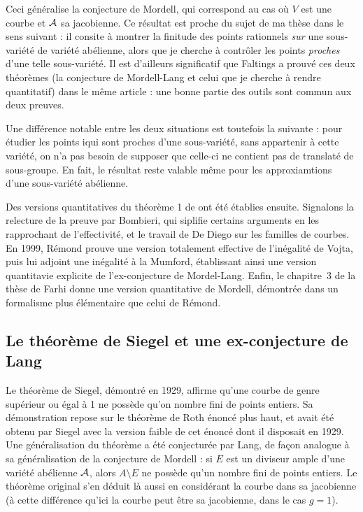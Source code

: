 \documentclass[a4paper, 11pt]{article}
\renewcommand*\bsc{}
\begin{document}
Ceci généralise la conjecture de \bsc{Mordell}, qui correspond au cas où $V$
est une courbe et $\mathcal A$ sa jacobienne. Ce résultat est proche du sujet de ma
thèse dans le sens suivant : il consite à montrer la finitude des points
rationnels \emph{sur} une sous-variété de variété abélienne, alors que je
cherche à contrôler les points \emph{proches} d'une telle sous-variété. Il est
d'ailleurs significatif que \bsc{Faltings} a prouvé ces deux théorèmes (la
conjecture de \bsc{Mordell-Lang} et celui que je cherche à rendre quantitatif)
dans le même article : une bonne partie des outils sont commun aux deux
preuves.

Une différence notable entre les deux situations est toutefois la suivante :
pour étudier les points iqui sont proches d'une sous-variété, sans appartenir
à cette variété, on n'a pas besoin de supposer que celle-ci ne contient pas de
translaté de sous-groupe. En fait, le résultat reste valable même pour les
approxiamtions d'une sous-variété abélienne.

Des versions quantitatives du théorème 1 de \cite{falda} ont été établies
ensuite. Signalons la relecture de la preuve par \bsc{Bombieri}, qui siplifie
certains arguments en les rapprochant de l'effectivité, et le travail de
\bsc{De Diego} sur les familles de courbes. En 1999, \bsc{Rémond} prouve une
version totalement effective de l'inégalité de \bsc{Vojta}, puis lui adjoint
une inégalité à la \bsc{Mumford}, établissant ainsi une version quantitavie
explicite de l'ex-conjecture de \bsc{Mordel-Lang}. Enfin, le chapitre~3 de la
thèse de \bsc{Farhi} \cite{farhith} donne une version quantitative de
\bsc{Mordell}, démontrée dans un formalisme plus élémentaire que celui de
\bsc{Rémond}.

\subsection{Le théorème de Siegel et une ex-conjecture de Lang}
\label{s-siegel}

Le théorème de \bsc{Siegel}, démontré en 1929, affirme qu'une courbe de genre
supérieur ou égal à 1 ne possède qu'on nombre fini de points entiers. Sa
démonstration repose sur le théorème de \bsc{Roth} énoncé plus haut, et avait
été obtenu par \bsc{Siegel} avec la version faible de cet énoncé dont il
disposait en 1929.  Une généralisation du théorème a été conjecturée par
\bsc{Lang}, de façon analogue à sa généralisation de la conjecture de
\bsc{Mordell} : si $E$ est un diviseur ample d'une variété abélienne $\mathcal A$,
alors $A \setminus E$ ne possède qu'un nombre fini de points entiers. Le
théorème original s'en déduit là aussi en considérant la courbe dans sa
jacobienne (à cette différence qu'ici la courbe peut être sa jacobienne, dans
le cas $g=1$).
\end{document}
